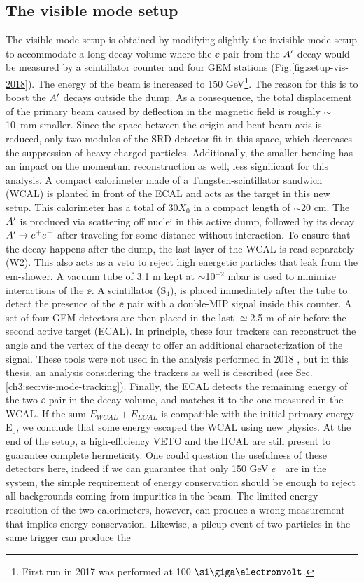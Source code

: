 \subsection{The visible mode setup}
\label{ch2:sec:vismode}

The visible mode setup is obtained by modifying slightly the invisible mode setup to accommodate a long decay volume where the $\ee$ pair from the $A'$ decay would be measured by a scintillator counter and four GEM stations (Fig.\ref{fig:setup-vis-2018}). The energy of the beam is increased to 150 GeV\footnote{First run in 2017 was performed at 100 $\gev$.}. The reason for this is to boost the $A'$ decays outside the dump. As a consequence, the total displacement of the primary beam caused by deflection in the magnetic field is roughly $\sim$\SI{10}{\milli\meter} smaller. Since the space between the origin and bent beam axis is reduced, only two modules of the SRD detector fit in this space, which decreases the suppression of heavy charged particles. Additionally, the smaller bending has an impact on the momentum reconstruction as well, less significant for this analysis. A compact calorimeter made of a Tungsten-scintillator sandwich (WCAL) is planted in front of the ECAL and acts as the target in this new setup. This calorimeter has a total of 30$X_0$ in a compact length of $\sim$20 \si{cm}. The $A'$ is produced via scattering off nuclei in this active dump, followed by its decay $A' \to e^+e^-$ after traveling for some distance without interaction. To ensure that the decay happens after the dump, the last layer of the WCAL is read separately (W2). This also acts as a veto to reject high energetic particles that leak from the em-shower. A vacuum tube of 3.1 \si{m} kept at $\sim$10$^{-2}$ \si{mbar} is used to minimize interactions of the $\ee$. A scintillator (S$_4$), is placed immediately after the tube to detect the presence of the $\ee$ pair with a double-MIP signal inside this counter. A set of four GEM detectors are then placed in the last $\simeq$2.5 \si{m} of air before the second active target (ECAL). In principle, these four trackers can reconstruct the angle and the vertex of the decay to offer an additional characterization of the signal. These tools were not used in the analysis performed in 2018 \cite{Banerjee:2019hmi}, but in this thesis, an analysis considering the trackers as well is described (see Sec.\ref{ch3:sec:vis-mode-tracking}). Finally, the ECAL detects the remaining energy of the two $\ee$ pair in the decay volume, and matches it to the one measured in the WCAL. If the sum $E_{WCAL}+E_{ECAL}$ is compatible with the initial primary energy E$_0$, we conclude that some energy escaped the WCAL using new physics. At the end of the setup, a high-efficiency VETO and the HCAL are still present to guarantee complete hermeticity. One could question the usefulness of these detectors here, indeed if we can guarantee that only 150 GeV $e^-$ are in the system, the simple requirement of energy conservation should be enough to reject all backgrounds coming from impurities in the beam. The limited energy resolution of the two calorimeters, however, can produce a wrong measurement that implies energy conservation. Likewise, a pileup event of two particles in the same trigger can produce the 